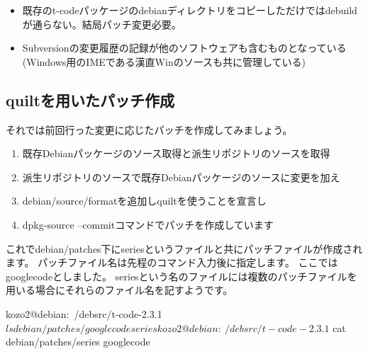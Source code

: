 \documentclass[mingoth,a4paper]{jsarticle}
\begin{document}
\begin{itemize}
\item 既存のt-codeパッケージのdebianディレクトリをコピーしただけではdebuildが通らない。結局パッチ変更必要。
\item Subversionの変更履歴の記録が他のソフトウェアも含むものとなっている(Windows用のIMEである漢直Winのソースも共に管理している)
\end{itemize}

\subsection{quiltを用いたパッチ作成}
それでは前回行った変更に応じたパッチを作成してみましょう。
\begin{enumerate}
\item 既存Debianパッケージのソース取得と派生リポジトリのソースを取得
\item 派生リポジトリのソースで既存Debianパッケージのソースに変更を加え
\item debian/source/formatを追加しquiltを使うことを宣言し
\item dpkg-source --commitコマンドでパッチを作成しています
\end{enumerate}


これでdebian/patches下にseriesというファイルと共にパッチファイルが作成されます。
パッチファイル名は先程のコマンド入力後に指定します。
ここではgooglecodeとしました。
seriesという名のファイルには複数のパッチファイルを用いる場合にそれらのファイル名を記すようです。

\begin{commandline}
kozo2@debian:~/debsrc/t-code-2.3.1$ ls debian/patches/
googlecode series
kozo2@debian:~/debsrc/t-code-2.3.1$ cat debian/patches/series
googlecode
\end{commandline}
\end{document}
